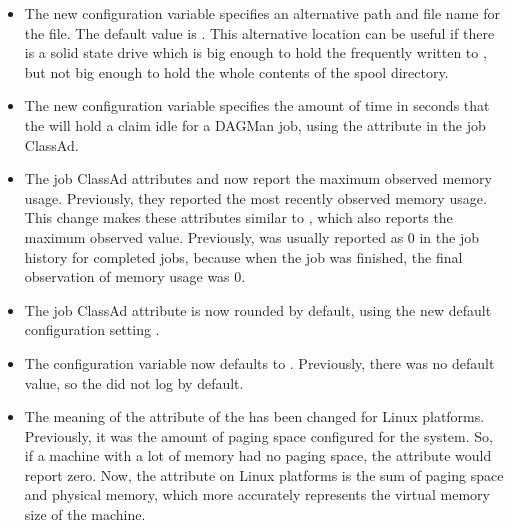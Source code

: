 \begin{itemize}

\item The new configuration variable  
specifies an alternative path and file name for the  file.
The default value is .
This alternative location can be
useful if there is a solid state drive which is big enough to hold the
frequently written to ,
but not big enough to hold the whole contents of the spool directory.

\item The new configuration variable 
specifies the amount of time in seconds that the  
will hold a claim idle for a DAGMan job, 
using the  attribute in the job ClassAd.

\item The job ClassAd attributes
 and  now
report the maximum observed memory usage.  
Previously, they reported the most recently observed memory usage.  
This change makes these attributes similar to , 
which also reports the maximum observed value.  
Previously,  was
usually reported as 0 in the job history for completed jobs, because
when the job was finished, the final observation of memory usage
was 0.

\item The job ClassAd attribute  is now rounded 
by default,
using the new default configuration setting
.

\item The configuration variable  now defaults to
.  Previously, there was no default value,
so the  did not log by default.

\item The meaning of the  attribute of the  
has been changed for Linux platforms.
Previously, it was the amount of paging space configured for the system.
So, if a machine with a lot of memory had no paging space, 
the  attribute would report zero.
Now, the  attribute on Linux platforms 
is the sum of paging space and physical memory, 
which more accurately represents the virtual memory size of the machine.


\end{itemize}
